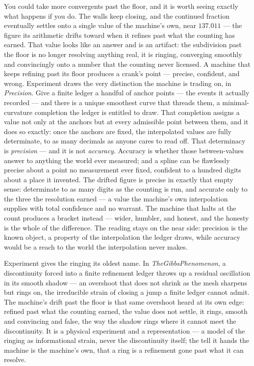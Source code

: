 You could take more convergents past the floor, and it is worth seeing exactly what happens if you do.
The walls keep closing, and the continued fraction eventually settles onto a single value of the machine's own, near
$137.011$ --- the figure its arithmetic drifts toward when it refines past what the counting has earned.
That value looks like an answer and is an artifact: the subdivision past the floor is no longer resolving anything real,
it is ringing, converging smoothly and convincingly onto a number that the counting never licensed.
A machine that keeps refining past its floor produces a crank's point --- precise, confident, and wrong.
Experiment draws the very distinction the machine is trading on, in \emph{Precision}.
Give a finite ledger a handful of anchor points --- the events it actually recorded --- and there is a unique smoothest
curve that threads them, a minimal-curvature completion the ledger is entitled to draw.
That completion assigns a value not only at the anchors but at every admissible point between them, and it does so
exactly: once the anchors are fixed, the interpolated values are fully determinate, to as many decimals as anyone cares to
read off.
That determinacy is \emph{precision} --- and it is not \emph{accuracy}.
Accuracy is whether those between-values answer to anything the world ever measured; and a spline can be flawlessly
precise about a point no measurement ever fixed, confident to a hundred digits about a place it invented.
The drifted figure is precise in exactly that empty sense: determinate to as many digits as the counting is run, and
accurate only to the three the resolution earned --- a value the machine's own interpolation supplies with total
confidence and no warrant.
The machine that halts at the count produces a bracket instead --- wider, humbler, and honest, and the honesty is the
whole of the difference.
The reading stays on the near side: precision is the known object, a property of the interpolation the ledger draws,
while accuracy would be a reach to the world the interpolation never makes.

Experiment gives the ringing its oldest name.
In \emph{TheGibbsPhenomenon}, a discontinuity forced into a finite refinement ledger throws up a residual oscillation in
its smooth shadow --- an overshoot that does not shrink as the mesh sharpens but rings on, the irreducible strain of
closing a jump a finite ledger cannot admit.
The machine's drift past the floor is that same overshoot heard at its own edge: refined past what the counting earned,
the value does not settle, it rings, smooth and convincing and false, the way the shadow rings where it cannot meet the
discontinuity.
It is a physical experiment and a representation --- a model of the ringing as informational strain, never the
discontinuity itself; the tell it hands the machine is the machine's own, that a ring is a refinement gone past what it
can resolve.

